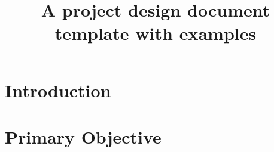 \documentclass[conference]{IEEEtran} %
\title{A project design document template with examples}
\author{
  
  \IEEEauthorblockN{%
    Philip~Linden\IEEEauthorrefmark{1},  %
  }
  \IEEEauthorblockA{%
    Linden Scientific \\ %
    Rochester, N.Y. \\
    \IEEEauthorrefmark{1}lindenphilipj@gmail.com
  }


}
\begin{document}
\maketitle%

\begin{abstract}
\end{abstract}

\section{Introduction}
\label{sec:introduction}

\section{Primary Objective}
\label{sec:primary-obj}
\end{document}
